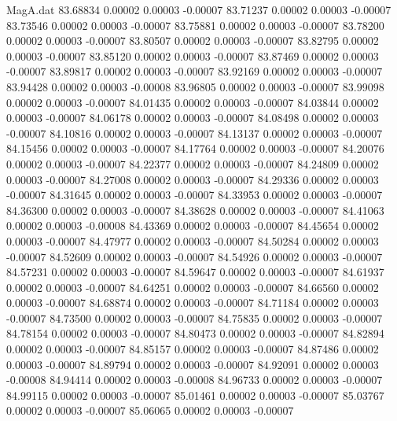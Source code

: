 \begin{filecontents}{MagA.dat}
  83.68834    0.00002    0.00003   -0.00007
  83.71237    0.00002    0.00003   -0.00007
  83.73546    0.00002    0.00003   -0.00007
  83.75881    0.00002    0.00003   -0.00007
  83.78200    0.00002    0.00003   -0.00007
  83.80507    0.00002    0.00003   -0.00007
  83.82795    0.00002    0.00003   -0.00007
  83.85120    0.00002    0.00003   -0.00007
  83.87469    0.00002    0.00003   -0.00007
  83.89817    0.00002    0.00003   -0.00007
  83.92169    0.00002    0.00003   -0.00007
  83.94428    0.00002    0.00003   -0.00008
  83.96805    0.00002    0.00003   -0.00007
  83.99098    0.00002    0.00003   -0.00007
  84.01435    0.00002    0.00003   -0.00007
  84.03844    0.00002    0.00003   -0.00007
  84.06178    0.00002    0.00003   -0.00007
  84.08498    0.00002    0.00003   -0.00007
  84.10816    0.00002    0.00003   -0.00007
  84.13137    0.00002    0.00003   -0.00007
  84.15456    0.00002    0.00003   -0.00007
  84.17764    0.00002    0.00003   -0.00007
  84.20076    0.00002    0.00003   -0.00007
  84.22377    0.00002    0.00003   -0.00007
  84.24809    0.00002    0.00003   -0.00007
  84.27008    0.00002    0.00003   -0.00007
  84.29336    0.00002    0.00003   -0.00007
  84.31645    0.00002    0.00003   -0.00007
  84.33953    0.00002    0.00003   -0.00007
  84.36300    0.00002    0.00003   -0.00007
  84.38628    0.00002    0.00003   -0.00007
  84.41063    0.00002    0.00003   -0.00008
  84.43369    0.00002    0.00003   -0.00007
  84.45654    0.00002    0.00003   -0.00007
  84.47977    0.00002    0.00003   -0.00007
  84.50284    0.00002    0.00003   -0.00007
  84.52609    0.00002    0.00003   -0.00007
  84.54926    0.00002    0.00003   -0.00007
  84.57231    0.00002    0.00003   -0.00007
  84.59647    0.00002    0.00003   -0.00007
  84.61937    0.00002    0.00003   -0.00007
  84.64251    0.00002    0.00003   -0.00007
  84.66560    0.00002    0.00003   -0.00007
  84.68874    0.00002    0.00003   -0.00007
  84.71184    0.00002    0.00003   -0.00007
  84.73500    0.00002    0.00003   -0.00007
  84.75835    0.00002    0.00003   -0.00007
  84.78154    0.00002    0.00003   -0.00007
  84.80473    0.00002    0.00003   -0.00007
  84.82894    0.00002    0.00003   -0.00007
  84.85157    0.00002    0.00003   -0.00007
  84.87486    0.00002    0.00003   -0.00007
  84.89794    0.00002    0.00003   -0.00007
  84.92091    0.00002    0.00003   -0.00008
  84.94414    0.00002    0.00003   -0.00008
  84.96733    0.00002    0.00003   -0.00007
  84.99115    0.00002    0.00003   -0.00007
  85.01461    0.00002    0.00003   -0.00007
  85.03767    0.00002    0.00003   -0.00007
  85.06065    0.00002    0.00003   -0.00007

\end{filecontents}
